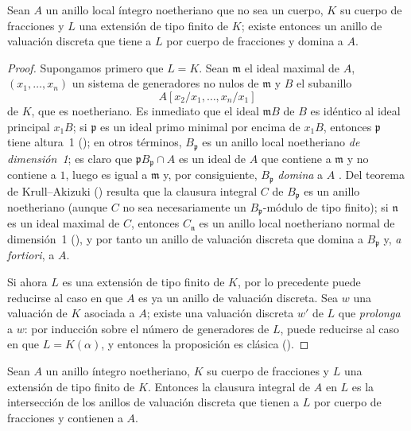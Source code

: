 \documentclass[oneside,10pt]{amsart}
\let\EGAOriginalLabel\label
\renewcommand{\label}[1]{\phantomsection\EGAOriginalLabel{#1}}
\begin{document}

\begin{proposition}[7.1.7]
\label{II.7.1.7}
Sean $A$ un anillo local íntegro noetheriano que no sea un cuerpo, $K$ su cuerpo de fracciones y $L$ una extensión de tipo finito de $K$;
existe entonces un anillo de valuación discreta que tiene a $L$ por cuerpo de fracciones y domina a $A$.
\end{proposition}

\begin{proof}
Supongamos primero que $L=K$.
Sean $\mathfrak{m}$ el ideal maximal de $A$, $(x_1,\ldots,x_n)$ un sistema de generadores no nulos de $\mathfrak{m}$ y $B$ el subanillo
\[
  A[x_2/x_1,\ldots,x_n/x_1]
\]
de $K$, que es noetheriano.
Es inmediato que el ideal $\mathfrak{m}B$ de $B$ es idéntico al ideal principal $x_1B$;
si $\mathfrak{p}$ es un ideal primo minimal por encima de $x_1B$, entonces $\mathfrak{p}$ tiene altura~1 (\cite[t.~I, p.~277]{I-13});
en otros términos, $B_\mathfrak{p}$ es un anillo local noetheriano \emph{de dimensión~1};
es claro que $\mathfrak{p}B_\mathfrak{p}\cap A$ es un ideal de $A$ que contiene a $\mathfrak{m}$ y no contiene a $1$, luego es igual a $\mathfrak{m}$ y, por consiguiente, $B_\mathfrak{p}$ \emph{domina} a $A$ .
Del teorema de Krull--Akizuki (\cite[p.~293]{II-25}) resulta que la clausura integral $C$ de $B_\mathfrak{p}$ es un anillo noetheriano (aunque $C$ no sea necesariamente un $B_\mathfrak{p}$-módulo de tipo finito);
si $\mathfrak{n}$ es un ideal maximal de $C$, entonces $C_\mathfrak{n}$ es un anillo local noetheriano normal de dimensión~1 (\cite[p.~295]{II-25}), y por tanto un anillo de valuación discreta que domina a $B_\mathfrak{p}$ y, \emph{a fortiori}, a $A$.

Si ahora $L$ es una extensión de tipo finito de $K$, por lo precedente puede reducirse al caso en que $A$ es ya un anillo de valuación discreta.
Sea $w$ una valuación de $K$ asociada a $A$;
existe una valuación discreta $w'$ de $L$ que \emph{prolonga} a $w$: por inducción sobre el número de generadores de $L$, puede reducirse al caso en que $L=K(\alpha)$, y entonces la proposición es clásica (\cite[p.~106]{II-24}).
\end{proof}


\begin{corollary}[7.1.8]
\label{II.7.1.8}
Sean $A$ un anillo íntegro noetheriano, $K$ su cuerpo de fracciones y $L$ una extensión de tipo finito de $K$.
Entonces la clausura integral de $A$ en $L$ es la intersección de los anillos de valuación discreta que tienen a $L$ por cuerpo de fracciones y contienen a $A$.
\end{corollary}
\end{document}
